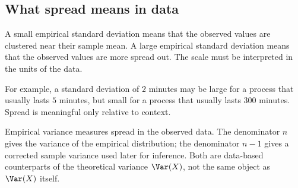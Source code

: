 \subsection*{What spread means in data}

A small empirical standard deviation means that the observed values are clustered
near their sample mean. A large empirical standard deviation means that the
observed values are more spread out. The scale must be interpreted in the units
of the data.

For example, a standard deviation of \(2\) minutes may be large for a process
that usually lasts \(5\) minutes, but small for a process that usually lasts
\(300\) minutes. Spread is meaningful only relative to context.

\begin{summarybox}
Empirical variance measures spread in the observed data. The denominator \(n\)
gives the variance of the empirical distribution; the denominator \(n-1\) gives a
corrected sample variance used later for inference. Both are data-based
counterparts of the theoretical variance \(\Var(X)\), not the same object as
\(\Var(X)\) itself.
\end{summarybox}
